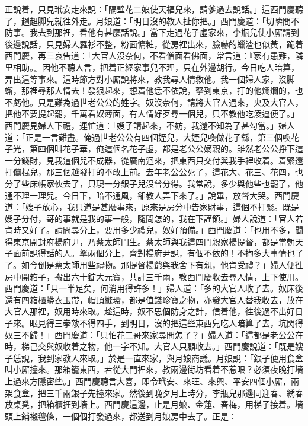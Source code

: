正說着，只見玳安走來說：「隔壁花二娘使天福兒來，請爹過去說話。」這西門慶聽了，趔趄脚兒就徃外走。月娘道：「明日沒的教人扯你把。」西門慶道：「切隣間不防事。我去到那裡，看他有甚麼話說。」當下走過花子虛家來，李瓶兒使小厮請到後邊說話，只見婦人羅衫不整，粉面慵粧，從房裡出來，臉嚇的蠟渣也似黃，跪着西門慶，再三哀告道：「大官人沒奈何，不看僧面看佛面，{}常言道：『家有患難，隣里相助。』因他不聽人言，把着正經家事兒不理，只在外邊胡行。今日吃人暗算，弄出這等事來。這時節方對小厮說將來，教我尋人情救他。我一個婦人家，沒脚蠏，那裡尋那人情去！發狠起來，想着他恁不依說，拏到東京，打的他爛爛的，也不虧他。{}只是難為過世老公公的姓字。奴沒奈何，請將大官人過來，央及大官人，把他不要提起罷，千萬看奴薄面，有人情好歹尋一個兒，只不教他吃淩逼便了。」西門慶見婦人下禮，連忙道：「嫂子請起來，不妨，我還不知為了甚勾當。」婦人道：「正是一言難盡。俺過世老公公有四個姪兒，大姪兒喚做花子繇，第三個喚花子光，第四個叫花子華，俺這個名花子虛，都是老公公嫡親的。雖然老公公掙下這一分錢財，見我這個兒不成器，從廣南迴來，把東西只交付與我手裡收着。着緊還打儻棍兒，那三個越發打的不敢上前。去年老公公死了，這花大、花三、花四，也分了些床帳家伙去了，只現一分銀子兒沒曾分得。我常說，多少與他些也罷了，他通不理一理兒。今日下，暗不通風，卻教人弄下來了。」說畢，放聲大哭。西門慶道：「嫂子放心，我只道是甚麼事來，原來是房分中告家財事，這個不打緊。既是嫂子分付，哥的事就是我的事一般，隨問怎的，我在下謹領。」婦人說道：「官人若肯時又好了。請問尋分上，要用多少禮兒，奴好預備。」西門慶道：「也用不多，聞得東京開封府楊府尹，乃蔡太師門生。蔡太師與我這四門親家楊提督，都是當朝天子面前說得話的人。拏兩個分上，齊對楊府尹說，有個不依的！不拘多大事情也了了。如今倒是蔡太師用些禮物。那提督楊爺與我舍下有親，他肯受禮？」婦人便徃房中開箱子，搬出六十錠大元寶，共計三千兩，教西門慶收去尋人情，上下使用。西門慶道：「只一半足矣，何消用得許多！」婦人道：「多的大官人收了去。奴床後還有四箱櫃蟒衣玉帶，帽頂縧環，都是值錢珍寶之物，亦發大官人替我收去，放在大官人那裡，奴用時來取。{}趁這時，奴不思個防身之計，信着他，徃後過不出好日子來。眼見得三拳敵不得四手，到明日，沒的把這些東西兒吃人暗算了去，坑閃得奴三不歸！」西門慶道：「只怕花二哥來家尋問怎了？」婦人道：「這都是老公公在時，梯己交與奴收着之物，他一字不知。大官人只顧收去。」西門慶說道：「既是嫂子恁說，我到家教人來取。」於是一直來家，與月娘商議。月娘說：「銀子便用食盒叫小厮擡來。那箱籠東西，若從大門裡來，教兩邊街坊看着不惹眼？必須夜晚打墻上過來方隱密些。」西門慶聽言大喜，即令玳安、來旺、來興、平安四個小厮，兩架食盒，把三千兩銀子先擡來家。然後到晚夕月上時分，李瓶兒那邊同迎春、綉春放桌凳，把箱櫃捱到墻上。西門慶這邊，止是月娘、金蓮、春梅，用梯子接着。墻頭上鋪襯氊條，一個個打發過來，都送到月娘房中去了。正是：

